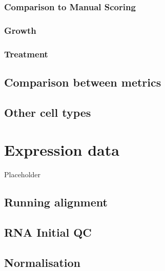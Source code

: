 \documentclass[
]{book}
\begin{document}
\hypertarget{comparison-to-manual-scoring}{%
\subsection{Comparison to Manual Scoring}\label{comparison-to-manual-scoring}}

\hypertarget{growth-2}{%
\subsection{Growth}\label{growth-2}}

\hypertarget{treatment-1}{%
\subsection{Treatment}\label{treatment-1}}

\hypertarget{comparison-between-metrics}{%
\section{Comparison between metrics}\label{comparison-between-metrics}}

\hypertarget{other-cell-types}{%
\section{Other cell types}\label{other-cell-types}}

\hypertarget{expression-data}{%
\chapter{Expression data}\label{expression-data}}

Placeholder

\hypertarget{running-alignment}{%
\section{Running alignment}\label{running-alignment}}

\hypertarget{rna-initial-qc}{%
\section{RNA Initial QC}\label{rna-initial-qc}}

\hypertarget{normalisation}{%
\section{Normalisation}\label{normalisation}}
\end{document}
